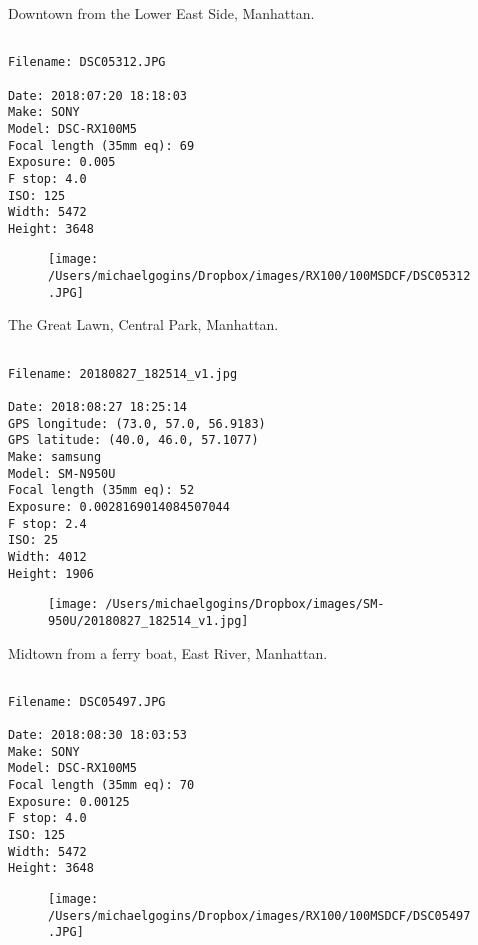\documentclass[11pt,letter,DIV=14,paper=landscape]{scrbook}
\begin{document}
\clearpage
\noindent Downtown from the Lower East Side, Manhattan.
\noindent
\begin{lstlisting}

Filename: DSC05312.JPG

Date: 2018:07:20 18:18:03
Make: SONY
Model: DSC-RX100M5
Focal length (35mm eq): 69
Exposure: 0.005
F stop: 4.0
ISO: 125
Width: 5472
Height: 3648
\end{lstlisting}
\clearpage

\begin{figure}
\texttt{[image: /Users/michaelgogins/Dropbox/images/RX100/100MSDCF/DSC05312.JPG]}
\end{figure}
    
\clearpage
\noindent The Great Lawn, Central Park, Manhattan.
\noindent
\begin{lstlisting}

Filename: 20180827_182514_v1.jpg

Date: 2018:08:27 18:25:14
GPS longitude: (73.0, 57.0, 56.9183)
GPS latitude: (40.0, 46.0, 57.1077)
Make: samsung
Model: SM-N950U
Focal length (35mm eq): 52
Exposure: 0.0028169014084507044
F stop: 2.4
ISO: 25
Width: 4012
Height: 1906
\end{lstlisting}
\clearpage

\begin{figure}
\texttt{[image: /Users/michaelgogins/Dropbox/images/SM-950U/20180827\_182514\_v1.jpg]}
\end{figure}
    
\clearpage
\noindent Midtown from a ferry boat, East River, Manhattan.
\noindent
\begin{lstlisting}

Filename: DSC05497.JPG

Date: 2018:08:30 18:03:53
Make: SONY
Model: DSC-RX100M5
Focal length (35mm eq): 70
Exposure: 0.00125
F stop: 4.0
ISO: 125
Width: 5472
Height: 3648
\end{lstlisting}
\clearpage

\begin{figure}
\texttt{[image: /Users/michaelgogins/Dropbox/images/RX100/100MSDCF/DSC05497.JPG]}
\end{figure}
    
\end{document}

